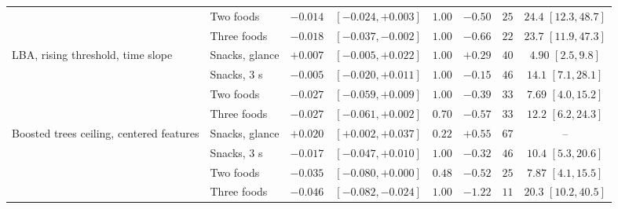 \begin{table}[t]
\begin{tabular}{>{\raggedright\arraybackslash}p{3.0cm}lcccccc}
 & Two foods & $-0.014$ & $[-0.024, +0.003]$ & $1.00$ & $-0.50$ & $25$ & $24.4$ $[12.3, 48.7]$ \\
 & Three foods & $-0.018$ & $[-0.037, -0.002]$ & $1.00$ & $-0.66$ & $22$ & $23.7$ $[11.9, 47.3]$ \\
\addlinespace
LBA, rising threshold, time slope & Snacks, glance & $+0.007$ & $[-0.005, +0.022]$ & $1.00$ & $+0.29$ & $40$ & $4.90$ $[2.5, 9.8]$ \\
 & Snacks, 3 s & $-0.005$ & $[-0.020, +0.011]$ & $1.00$ & $-0.15$ & $46$ & $14.1$ $[7.1, 28.1]$ \\
 & Two foods & $-0.027$ & $[-0.059, +0.009]$ & $1.00$ & $-0.39$ & $33$ & $7.69$ $[4.0, 15.2]$ \\
 & Three foods & $-0.027$ & $[-0.061, +0.002]$ & $0.70$ & $-0.57$ & $33$ & $12.2$ $[6.2, 24.3]$ \\
\addlinespace
Boosted trees ceiling, centered features & Snacks, glance & $+0.020$ & $[+0.002, +0.037]$ & $0.22$ & $+0.55$ & $67$ & -- \\
 & Snacks, 3 s & $-0.017$ & $[-0.047, +0.010]$ & $1.00$ & $-0.32$ & $46$ & $10.4$ $[5.3, 20.6]$ \\
 & Two foods & $-0.035$ & $[-0.080, +0.000]$ & $0.48$ & $-0.52$ & $25$ & $7.87$ $[4.1, 15.5]$ \\
 & Three foods & $-0.046$ & $[-0.082, -0.024]$ & $1.00$ & $-1.22$ & $11$ & $20.3$ $[10.2, 40.5]$ \\
\bottomrule
\end{tabular}
\end{table}
